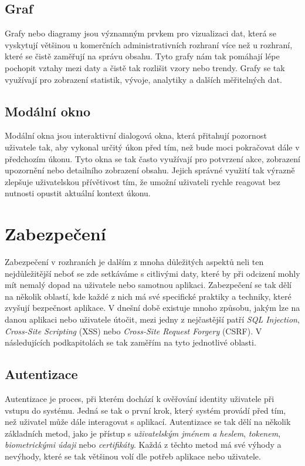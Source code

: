 \subsection*{Graf}
\label{subsec:admin-tags-chart}
Grafy nebo diagramy jsou významným prvkem pro vizualizaci dat, která se vyskytují většinou u komerčních administrativních rozhraní více než u rozhraní, které se čistě zaměřují na správu obsahu. Tyto grafy nám tak pomáhají lépe pochopit vztahy mezi daty a čistě tak rozlišit vzory nebo trendy. Grafy se tak využívají pro zobrazení statistik, vývoje, analytiky a dalších měřitelných dat.

\subsection*{Modální okno}
\label{subsec:admin-tags-modal}
Modální okna jsou interaktivní dialogová okna, která přitahují pozornost uživatele tak, aby vykonal určitý úkon před tím, než bude moci pokračovat dále v předchozím úkonu. Tyto okna se tak často využívají pro potvrzení akce, zobrazení upozornění nebo detailního zobrazení obsahu. Jejich správné využití tak výrazně zlepšuje uživatelskou přívětivost tím, že umožní uživateli rychle reagovat bez nutnosti opustit aktuální kontext úkonu.

\section{Zabezpečení}
\label{sec:security}
Zabezpečení v rozhraních je dalším z mnoha důležitých aspektů neli ten nejdůležitější neboť se zde setkáváme s citlivými daty, které by při odcizení mohly mít nemalý dopad na uživatele nebo samotnou aplikaci. Zabezpečení se tak dělí na několik oblastí, kde každé z nich má své specifické praktiky a techniky, které zvyšují bezpečnost aplikace. V dnešní době existuje mnoho způsobu, jakým lze na danou aplikaci nebo uživatele útočit, mezi jedny z nejčastější patří \textit{SQL Injection}, \textit{Cross-Site Scripting} (XSS) nebo \textit{Cross-Site Request Forgery} (CSRF). V následujících podkapitolách se tak zaměřím na tyto jednotlivé oblasti.

\subsection{Autentizace}
\label{subsec:security-authentication}
Autentizace je proces, při kterém dochází k ověřování identity uživatele při vstupu do systému. Jedná se tak o první krok, který systém provádí před tím, než uživatel může dále interagovat s aplikací. Autentizace se tak dělí na několik základních metod, jako je přístup s \textit{uživatelským jménem a heslem}, \textit{tokenem}, \textit{biometrickými údaji} nebo \textit{certifikáty}. Každá z těchto metod má své výhody a nevýhody, které se tak většinou volí dle potřeb aplikace nebo uživatele.

